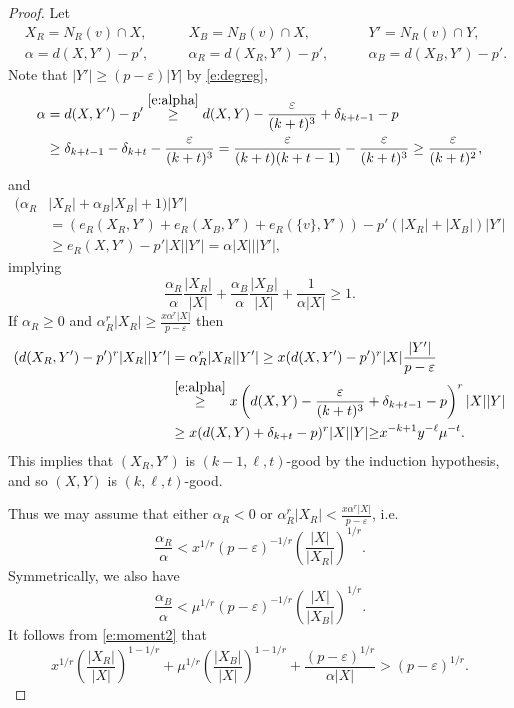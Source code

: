 \documentclass[reqno,final,12pt]{amsart}
\newcommand{\eps}{\varepsilon}
\newcommand{\fs}[2]{\left(\frac{#1}{#2}\right)}
\newcommand{\s}[1]{\left(#1\right)}
\begin{document}
\begin{proof}
Let \begin{align*} &X_R = N_{R}(v) \cap X,\qquad &X_B =N_{B}(v) \cap X,\qquad  &Y'=N_{R}(v) \cap Y, \\ &\alpha = d(X,Y')-p', \qquad &\alpha_R = d(X_R,Y')-p', \qquad &\alpha_B = d(X_B,Y')-p'.\end{align*} Note that $|Y'| \geq (p-\eps)|Y|$ by \eqref{e:degreg},
 \begin{align*} \alpha &= d(X,Y')-p' \stackrel{\eqref{e:alpha}}{\geq} d(X,Y) -\frac{\eps}{(k+t)^3}+ \delta_{k+t-1} - p \\ &\geq  \delta_{k+t-1} - \delta_{k+t}  -\frac{\eps}{(k+t)^3} =  \frac{\eps}{(k+t)(k+t-1)}-\frac{\eps}{(k+t)^3} \geq \frac{\eps}{(k+t)^2},\end{align*}  and 
\begin{align*} 
(\alpha_R&|X_R|+\alpha_B|X_B| + 1)|Y'|\\ &=(e_R(X_R,Y')+e_R(X_B,Y')+e_R(\{v\},Y'))-p'(|X_R|+|X_B|)|Y'|\\ &\geq e_R(X,Y')-p'|X||Y'| = \alpha|X|||Y'|,
\end{align*}
implying
\begin{equation}\label{e:moment2}
\frac{\alpha_R}{\alpha}\frac{|X_R|}{|X|} +\frac{\alpha_B}{\alpha}\frac{|X_B|}{|X|} + \frac{1}{\alpha|X|}\geq 1.
\end{equation} 
If $\alpha_R \geq 0$ and 
$\alpha_R^r|X_R| \geq \frac{x\alpha^r|X|}{p-\eps}$ then \begin{align*} (d(X_R,Y')-p')^r|X_R||Y'| &=\alpha_R^r|X_R||Y'|  \geq x(d(X,Y')  - p')^r|X|\frac{|Y'|}{p-\eps} \\&\stackrel{\eqref{e:alpha}}{\geq} x\s{d(X,Y) -\frac{\eps}{(k+t)^3}+ \delta_{k+t-1} - p}^r|X||Y| \\ &\geq x(d(X,Y) + \delta_{k+t} - p)^r|X||Y| {\geq} x^{-k+1}y^{-\ell}\mu^{-t}.\end{align*}
This implies that $(X_R,Y')$ is $(k-1,\ell,t)$-good by the induction hypothesis, and so $(X,Y)$ is $(k,\ell,t)$-good.

Thus we may assume that either $\alpha_R < 0$ or  $\alpha_R^r|X_R| < \frac{x\alpha^r|X|}{p-\eps}$, i.e. $$\frac{\alpha_R}{\alpha} < x^{1/r}(p-\eps)^{-1/r}\fs{|X|}{|X_R|}^{1/r}.$$ Symmetrically, we also have $$\frac{\alpha_B}{\alpha} <  \mu^{1/r}(p-\eps)^{-1/r}\fs{|X|}{|X_B|}^{1/r}.$$
It follows from \eqref{e:moment2} that
\begin{equation}\label{e:moment3}
x^{1/r}\fs{|X_R|}{|X|}^{1-1/r}+\mu^{1/r}\fs{|X_B|}{|X|}^{1-1/r}+ \frac{(p-\eps)^{1/r}}{\alpha|X|} >(p-\eps)^{1/r}. 
\end{equation}


\end{proof}
\end{document}
